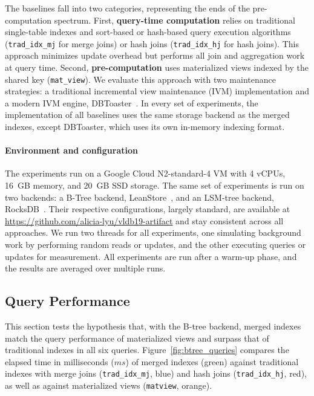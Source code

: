 \documentclass[sigconf, pdfa, nonacm]{acmart}
\newcommand\vldbavailabilityurl{https://github.com/alicia-lyu/vldb19-artifact}
\begin{document}
The baselines fall into two categories, representing the ends of the pre-computation spectrum.
First, \textbf{query-time computation} relies on traditional single-table indexes and sort-based or hash-based query execution algorithms (\texttt{trad\_idx\_mj} for merge joins) or hash joins (\texttt{trad\_idx\_hj} for hash joins). This approach minimizes update overhead but performs all join and aggregation work at query time.
Second, \textbf{pre-computation} uses materialized views indexed by the shared key (\texttt{mat\_view}). We evaluate this approach with two maintenance strategies: a traditional incremental view maintenance (IVM) implementation and a modern IVM engine, DBToaster~\cite{dbtoaster}.
In every set of experiments, the implementation of all baselines uses the same storage backend as the merged indexes, except DBToaster, which uses its own in-memory indexing format.

\begin{sloppypar}
    \paragraph{Environment and configuration}
    The experiments run on a Google Cloud N2-standard-4 VM with 4 vCPUs, 16~GB memory, and 20~GB SSD storage. 
    The same set of experiments is run on two backends: a B-Tree backend, LeanStore~\cite{leanstore18}, and an LSM-tree backend, RocksDB~\cite{rocksdb21}. 
    Their respective configurations, largely standard, are available at \url{\vldbavailabilityurl} and stay consistent across all approaches.
    We run two threads for all experiments, one simulating background work by performing random reads or updates, and the other executing queries or updates for measurement.
    All experiments are run after a warm-up phase, and the results are averaged over multiple runs.
\end{sloppypar} %

\subsection{Query Performance}\label{subsec:query_perf}

\begin{sloppypar}
This section tests the hypothesis that, with the B-tree backend, merged indexes match the query performance of materialized views and surpass that of traditional indexes in all six queries.
Figure~\ref{fig:btree_queries} compares the elapsed time in milliseconds (\(ms\)) of merged indexes (green) against traditional indexes with merge joins (\texttt{trad\_idx\_mj}, blue) and hash joins (\texttt{trad\_idx\_hj}, red), as well as against materialized views (\texttt{matview}, orange).
\end{sloppypar}
\end{document}
